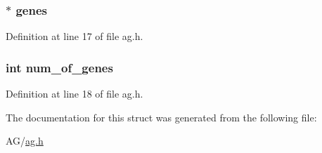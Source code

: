 \subsubsection[{genes}]{$\ast$ genes}\label{structchromosomes_a60dbdcb96ea8257921bfd3c7813bc40b}


Definition at line 17 of file ag.\+h.

\hypertarget{structchromosomes_ac2ff87645aefa81bbeaaa4ea54ec9781}{}
\subsubsection[{num\+\_\+of\+\_\+genes}]{\setlength{\rightskip}{0pt plus 5cm}int num\+\_\+of\+\_\+genes}\label{structchromosomes_ac2ff87645aefa81bbeaaa4ea54ec9781}


Definition at line 18 of file ag.\+h.



The documentation for this struct was generated from the following file\+:\begin{DoxyCompactItemize}
\item 
A\+G/\hyperlink{ag_8h}{ag.\+h}\end{DoxyCompactItemize}
